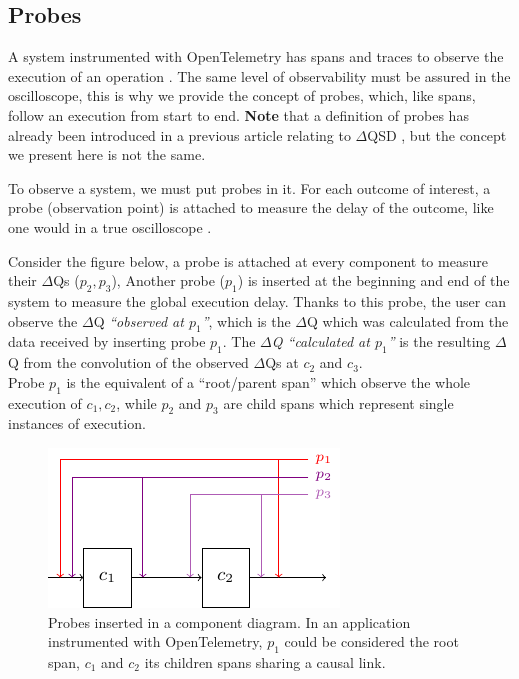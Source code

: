 \subsection{Probes}

A system instrumented with OpenTelemetry has spans and traces to observe the execution of an operation \cite{otel-t}. The same level of observability must be assured in the oscilloscope, this is why we provide the concept of probes, which, like spans, follow an execution from start to end. \textbf{Note} that a definition of probes has already been introduced in a previous article relating to $\Delta$QSD \cite{dq-br}, but the concept we present here is not the same.

To observe a system, we must put probes in it. For each outcome of interest, a probe (observation point) is attached to measure the delay of the outcome, like one would in a true oscilloscope \cite{post}.

Consider the figure below, a probe is attached at every component to measure their $\Delta$Qs ($p_2, p_3$),  Another probe ($p_1$) is inserted at the beginning and end of the system to measure the global execution delay. Thanks to this probe, the user can observe the $\Delta$Q \textit{``observed at $p_1$''}, which is the $\Delta$Q which was calculated from the data received by inserting probe $p_1$. The \textit{$\Delta$Q ``calculated at $p_1$''} is the resulting $\Delta$Q from the convolution of the observed $\Delta$Qs at $c_2$ and $c_3$. \\
Probe $p_1$ is the equivalent of a ``root/parent span'' which observe the whole execution of $c_1, c_2$, while $p_2$ and $p_3$ are child spans which represent single instances of execution.

    \begin{figure}[H]
        \begin{center}
            \includegraphics[scale=1.8]{tikz/probes.pdf}
        \end{center}
        \caption{Probes inserted in a component diagram. In an application instrumented with OpenTelemetry, $p_1$ could be considered the root span, $c_1$ and $c_2$ its children spans sharing a causal link.}
        \label{fig:probes}
    \end{figure}



